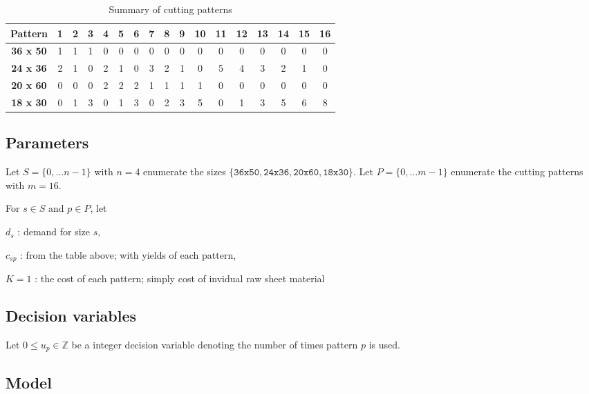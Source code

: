 \documentclass[11pt,oneside]{article}
\newcommand{\Int}{\mathbb{Z}}
\begin{document}
\begin{table}[h]
    \center
    \caption{Summary of cutting patterns}
    \begin{tabular}{ccccccccccccccccc}
        \hline
        \textbf{Pattern} & \textbf{1}& \textbf{2}& \textbf{3}& \textbf{4}& \textbf{5}& \textbf{6}& \textbf{7}& \textbf{8}& \textbf{9}& \textbf{10}& \textbf{11}& \textbf{12}& \textbf{13}& \textbf{14}& \textbf{15}& \textbf{16} \\
        \hline
        \textbf{36 x 50} & 1 & 1 & 1 & 0 & 0 & 0 & 0 & 0 & 0 & 0 & 0 & 0 & 0 & 0 & 0 & 0 \\
        \textbf{24 x 36} & 2 & 1 & 0 & 2 & 1 & 0 & 3 & 2 & 1 & 0 & 5 & 4 & 3 & 2 & 1 & 0 \\
        \textbf{20 x 60} & 0 & 0 & 0 & 2 & 2 & 2 & 1 & 1 & 1 & 1 & 0 & 0 & 0 & 0 & 0 & 0 \\
        \textbf{18 x 30} & 0 & 1 & 3 & 0 & 1 & 3 & 0 & 2 & 3 & 5 & 0 & 1 & 3 & 5 & 6 & 8 \\
        \hline
    \end{tabular}
\end{table}

\subsection{Parameters}

Let $S =\lbrace 0, \ldots n-1\rbrace$ with $n=4$ enumerate the sizes
$\lbrace \texttt{36x50}, \texttt{24x36}, \texttt{20x60}, \texttt{18x30}\rbrace$.
Let $P=\lbrace 0, \ldots m-1\rbrace$ enumerate the cutting patterns with $m=16$.

For $s\in S$ and $p\in P$, let

$d_{s}$ : demand for size $s$,

$c_{sp}$ : from the table above; with yields of each pattern,

$K=1$ : the cost of each pattern; simply cost of invidual raw sheet material

\subsection{Decision variables}

Let $0 \leq u_p \in \Int$ be a integer decision variable denoting the number
of times pattern $p$ is used.

\subsection{Model}
\end{document}
